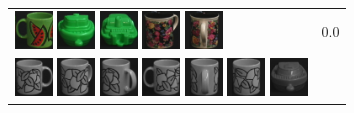 \begin{figure}[!bp]
\begin{tabular}{m{11cm} | m{3cm} |}
\includegraphics[width=1cm]{coil/beeld-31.eps}
\includegraphics[width=1cm]{coil/beeld-56.eps}
\includegraphics[width=1cm]{coil/beeld-59.eps}
\includegraphics[width=1cm]{coil/beeld-63.eps}
\includegraphics[width=1cm]{coil/beeld-65.eps}
& {\scriptsize 0.0}
\\
\includegraphics[width=1cm]{coil/beeld-48.eps}
\includegraphics[width=1cm]{coil/beeld-51.eps}
\includegraphics[width=1cm]{coil/beeld-52.eps}
\includegraphics[width=1cm]{coil/beeld-49.eps}
\includegraphics[width=1cm]{coil/beeld-53.eps}
\includegraphics[width=1cm]{coil/beeld-50.eps}
\includegraphics[width=1cm]{coil/beeld-26.eps}

\end{tabular}
\end{figure}
